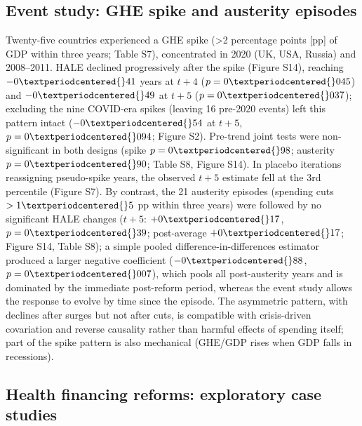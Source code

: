 \documentclass[12pt,a4paper]{article}
\begin{document}
\subsection*{Event study: GHE spike and austerity episodes}

Twenty-five countries experienced a GHE spike (>2 percentage points [pp] of GDP within three years; Table S7), concentrated in 2020 (UK, USA, Russia) and 2008--2011. HALE declined progressively after the spike (Figure S14), reaching $-0{\textperiodcentered{}}41$ years at $t+4$ ($p = 0{\textperiodcentered{}}045$) and $-0{\textperiodcentered{}}49$ at $t+5$ ($p = 0{\textperiodcentered{}}037$); excluding the nine COVID-era spikes (leaving 16 pre-2020 events) left this pattern intact ($-0{\textperiodcentered{}}54$ at $t+5$, $p = 0{\textperiodcentered{}}094$; Figure S2). Pre-trend joint tests were non-significant in both designs (spike $p = 0{\textperiodcentered{}}98$; austerity $p = 0{\textperiodcentered{}}90$; Table S8, Figure S14). In placebo iterations reassigning pseudo-spike years, the observed $t+5$ estimate fell at the 3rd percentile (Figure S7). By contrast, the 21 austerity episodes (spending cuts $>1{\textperiodcentered{}}5$ pp within three years) were followed by no significant HALE changes ($t+5$: $+0{\textperiodcentered{}}17$, $p = 0{\textperiodcentered{}}39$; post-average $+0{\textperiodcentered{}}17$; Figure S14, Table S8); a simple pooled difference-in-differences estimator produced a larger negative coefficient ($-0{\textperiodcentered{}}88$, $p = 0{\textperiodcentered{}}007$), which pools all post-austerity years and is dominated by the immediate post-reform period, whereas the event study allows the response to evolve by time since the episode. The asymmetric pattern, with declines after surges but not after cuts, is compatible with crisis-driven covariation and reverse causality rather than harmful effects of spending itself; part of the spike pattern is also mechanical (GHE/GDP rises when GDP falls in recessions).

\subsection*{Health financing reforms: exploratory case studies}
\end{document}
